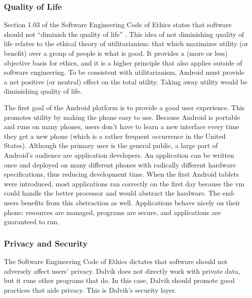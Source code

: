 \documentclass[11pt]{article}
\begin{document}
\begin{multicols}{2}

\subsubsection{Quality of Life} %
\label{ssub:quality}

Section 1.03 of the Software Engineering Code of Ethics states that software
should not ``diminish the quality of life'' \cite[\S1.03]{secode}.  This idea of
not diminishing quality of life relates to the ethical theory of utilitarianism:
that which maximizes utility (or benefit) over a group of people is what is
good. \cite[pg.~16]{utilitarianism}  It provides a (more or less) objective basis for ethics, and it is a
higher principle that also applies outside of software engineering.  To be
consistent with utilitarianism, Android must provide a net positive (or neutral)
effect on the total utility.  Taking away utility would be diminishing quality
of life.

The first goal of the Android platform is to provide a good user experience.
This promotes utility by making the phone easy to use.  Because Android is
portable and runs on many phones, users don't have to learn a new interface
every time they get a new phone (which is a rather frequent occurrence in the
United States).  Although the primary user is the general public, a large part
of Android's audience are application developers.  An application can be written
once and deployed on many different phones with radically different hardware
specifications, thus reducing development time.  When the first Android tablets
were introduced, most applications ran correctly on the first day because the
\gls{vm} could handle the better processor and would abstract the hardware.
\cite{android-tablet}  The end-users benefits from this abstraction as well.
Applications behave nicely on their phone: resources are managed, programs are
secure, and applications are guaranteed to run.


\subsubsection{Privacy and Security} %
\label{ssub:privacy}

The Software Engineering Code of Ethics dictates that software should not
adversely affect users' privacy. \cite[\S1.03]{secode} Dalvik does not directly
work with private data, but it runs other programs that do.  In this case,
Dalvik should promote good practices that aide privacy.  This is Dalvik's
security layer.


\end{multicols}
\end{document}
